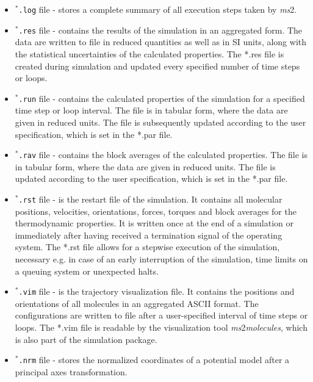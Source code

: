 \begin{itemize}
	\item \texttt{$^{*}$\hspace{-3pt}.log} file - stores a complete summary of all execution steps taken by \textit{ms}2.
	\item \texttt{$^{*}$\hspace{-3pt}.res} file - contains the results of the simulation in an aggregated form. The data are written to file in reduced quantities as well as in SI units, along with the statistical uncertainties of the calculated properties. The *.res file is created during simulation and updated every specified number of time steps or loops. 
	\item \texttt{$^{*}$\hspace{-3pt}.run} file - contains the calculated properties of the simulation for a specified time step or loop interval. The file is in tabular form, where the data are given in reduced units. The file is subsequently updated according to the user specification, which is set in the *.par file.
	\item \texttt{$^{*}$\hspace{-3pt}.rav} file - contains the block averages of the calculated properties. The file is in tabular form, where the data are given in reduced units. The file is updated according to the user specification, which is set in the *.par file. 
	\item \texttt{$^{*}$\hspace{-3pt}.rst} file - is the restart file of the simulation. It contains all molecular positions, velocities, orientations, forces, torques and block averages for the thermodynamic properties. It is written once at the end of a simulation or immediately after having received a termination signal of the operating system. The *.rst file allows for a stepwise execution of the simulation, necessary e.g. in case of an early interruption of the simulation, time limits on a queuing system or unexpected halts.
	\item \texttt{$^{*}$\hspace{-3pt}.vim} file - is the trajectory visualization file. It contains the positions and orientations of all molecules in an aggregated ASCII format. The configurations are written to file after a user-specified interval of time steps or loops. The *.vim file is readable by the visualization tool \textit{ms}2\textit{molecules}, which is also part of the simulation package.
	\item \texttt{$^{*}$\hspace{-3pt}.nrm} file - stores the normalized coordinates of a potential model after a principal axes transformation.

\end{itemize}
